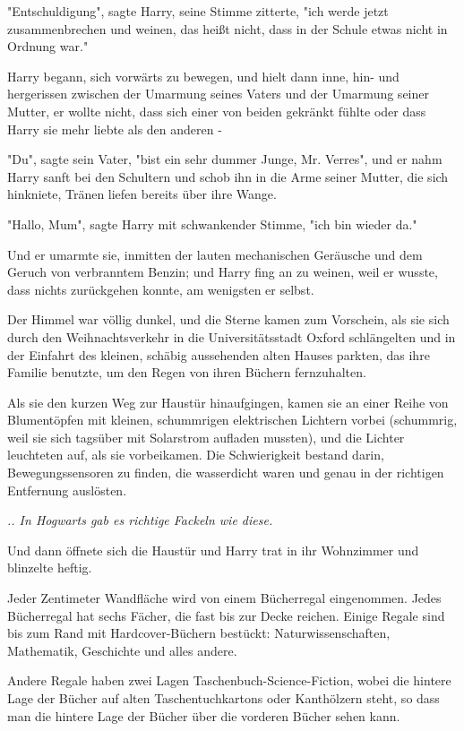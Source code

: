 {"Entschuldigung", sagte Harry, seine Stimme zitterte, "ich werde jetzt zusammenbrechen und weinen, das heißt nicht, dass in der Schule etwas nicht in Ordnung war."

Harry begann, sich vorwärts zu bewegen, und hielt dann inne, hin- und hergerissen zwischen der Umarmung seines Vaters und der Umarmung seiner Mutter, er wollte nicht, dass sich einer von beiden gekränkt fühlte oder dass Harry sie mehr liebte als den anderen -

"Du", sagte sein Vater, "bist ein sehr dummer Junge, Mr. Verres", und er nahm Harry sanft bei den Schultern und schob ihn in die Arme seiner Mutter, die sich hinkniete, Tränen liefen bereits über ihre Wange.

"Hallo, Mum", sagte Harry mit schwankender Stimme, "ich bin wieder da."

Und er umarmte sie, inmitten der lauten mechanischen Geräusche und dem Geruch von verbranntem Benzin; und Harry fing an zu weinen, weil er wusste, dass nichts zurückgehen konnte, am wenigsten er selbst.

Der Himmel war völlig dunkel, und die Sterne kamen zum Vorschein, als sie sich durch den Weihnachtsverkehr in die Universitätsstadt Oxford schlängelten und in der Einfahrt des kleinen, schäbig aussehenden alten Hauses parkten, das ihre Familie benutzte, um den Regen von ihren Büchern fernzuhalten.

Als sie den kurzen Weg zur Haustür hinaufgingen, kamen sie an einer Reihe von Blumentöpfen mit kleinen, schummrigen elektrischen Lichtern vorbei (schummrig, weil sie sich tagsüber mit Solarstrom aufladen mussten), und die Lichter leuchteten auf, als sie vorbeikamen. Die Schwierigkeit bestand darin, Bewegungssensoren zu finden, die wasserdicht waren und genau in der richtigen Entfernung auslösten.

\emph{.. In Hogwarts gab es richtige Fackeln wie diese.}

Und dann öffnete sich die Haustür und Harry trat in ihr Wohnzimmer und blinzelte heftig.

Jeder Zentimeter Wandfläche wird von einem Bücherregal eingenommen. Jedes Bücherregal hat sechs Fächer, die fast bis zur Decke reichen. Einige Regale sind bis zum Rand mit Hardcover-Büchern bestückt: Naturwissenschaften, Mathematik, Geschichte und alles andere.

Andere Regale haben zwei Lagen Taschenbuch-Science-Fiction, wobei die hintere Lage der Bücher auf alten Taschentuchkartons oder Kanthölzern steht, so dass man die hintere Lage der Bücher über die vorderen Bücher sehen kann.

}

